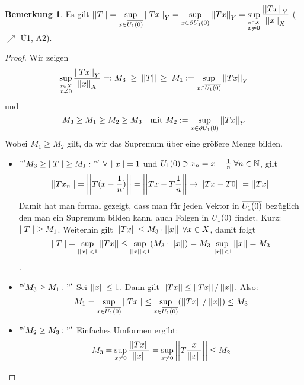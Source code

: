 \documentclass[ngerman]{report}
\theoremstyle{plain}%
\theoremstyle{definition}%
\theoremstyle{myStyle}
\newtheorem{bem}[thm]{Bemerkung}
\begin{document}
	\begin{bem}
		Es gilt 
		$\disp \norm{T} = \supT[A]\norm{Tx}_Y = \supT[R] \norm{Tx}_Y
		= \sup_{\overset{x \in X}{x \not = 0}} \frac{\norm{Tx}_Y}{\norm{x}_X}$
		($\nearrow$ Ü1, A2).

		\begin{proof}
			Wir zeigen  
				$$\sup_{\overset{x \in X}{x \not = 0}} \frac{\norm{Tx}_Y}{\norm{x}_X} =:M_3 \; \geq \: \norm{T} \: \geq \; M_1 := \supT[A]\norm{Tx}_Y $$ 
				und 
				$$ M_3 \geq M_1\geq M_2 \geq M_3 \quad \text{mit } M_2 := \supT[R] \norm{Tx}_Y$$ 
			Wobei $M_1 \geq M_2$ gilt, da wir das Supremum über eine größere Menge bilden.
			\begin{itemize}[  ]

				\item $"' M_3 \geq \norm{T} \geq M_1: "'$ $\forall \: \norm{x} = 1$ und $\EK \ni x_n = x - \frac{1}{n} \; \forall n\in\N$, gilt 
				$$\norm{Tx_n} = \norm{T(x-\frac{1}{n})} = \norm{Tx - T\frac{1}{n}} \to \norm{Tx - T0} = \norm{Tx}$$ 
				Damit hat man formal gezeigt, dass man für jeden Vektor in $\ov{\EK}$ bezüglich den man ein Supremum bilden kann, auch Folgen in $\EK$ findet. Kurz: $\norm{T} \geq M_1$.
				Weiterhin gilt $\norm{Tx} \leq M_3 \cdot \norm{x} \; \forall x\in X $, damit folgt 
					$$ \norm{T} = \sup_{\norm{x} < 1} \norm{Tx} \leq \sup_{\norm{x} < 1} (M_3 \cdot \norm{x}) = M_3 \sup_{\norm{x} < 1} \norm{x} = M_3$$.

				\item $\disp "' M_3 \geq  M_1: "'$ Sei $\norm{x} \leq 1$. Dann gilt $\norm{Tx} \leq \norm{Tx}/\norm{x}$. Also:
					$$ M_1 =  \supT[A]\norm{Tx} \leq \supT[A] (\norm{Tx}/ \norm{x}) \leq  M_3$$

				\item $\disp "' M_2 \geq  M_3: "'$ Einfaches Umformen ergibt:
					$$ M_3 = \sup_{{x \not = 0}} \frac{\norm{Tx}}{\norm{x}} = \sup_{{x \not = 0}} \norm{T\frac{x}{\norm{x}}} \leq M_2$$ 	
				
			\end{itemize}
		\end{proof}
	\end{bem}
\end{document}
